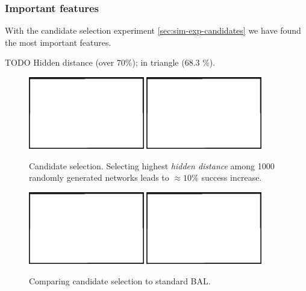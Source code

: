 
\subsubsection{Important features}
\label{sec:results-candidates} 

With the candidate selection experiment \ref{sec:sim-exp-candidates} we have found the most important features. 

TODO Hidden distance (over 70\%); in triangle (68.3 \%). \\


\begin{figure}[H]
  \centering
  \includegraphics[width=0.45\textwidth]{img/placeholder.png}  %
  \includegraphics[width=0.45\textwidth]{img/placeholder.png}  %
  \caption{Candidate selection. Selecting highest \emph{hidden distance} among 1000 randomly generated networks leads to $\approx 10\%$ success increase.}
  \label{fig:results-candidates-tlr}
\end{figure}


\begin{figure}[H]
  \centering
  \includegraphics[width=0.45\textwidth]{img/placeholder.png}  %
  \includegraphics[width=0.45\textwidth]{img/placeholder.png}  %
  \caption{Comparing candidate selection to standard BAL.}
  \label{fig:results-candidates-epoch}
\end{figure}

